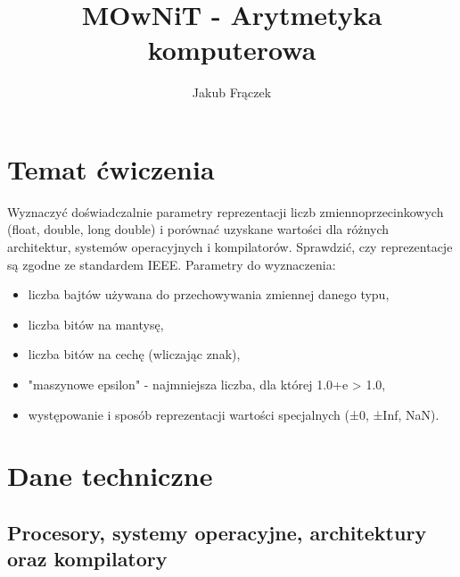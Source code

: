\documentclass{article}
\title{MOwNiT - Arytmetyka komputerowa}
\author{Jakub Frączek}
\begin{document}
\maketitle
\section{Temat ćwiczenia}

Wyznaczyć doświadczalnie parametry reprezentacji liczb zmiennoprzecinkowych
(float, double, long double) i porównać uzyskane wartości dla różnych architektur,
systemów operacyjnych i kompilatorów. Sprawdzić, czy reprezentacje są zgodne ze
standardem IEEE.
Parametry do wyznaczenia:
\begin{itemize}
\item liczba bajtów używana do przechowywania zmiennej danego typu,
\item liczba bitów na mantysę,
\item liczba bitów na cechę (wliczając znak),
\item "maszynowe epsilon" - najmniejsza liczba, dla której 1.0+e > 1.0,
\item  występowanie i sposób reprezentacji wartości specjalnych (±0, ±Inf, NaN).
\end{itemize}

\section{Dane techniczne}

\subsection{Procesory, systemy operacyjne, architektury oraz kompilatory}
\end{document}
